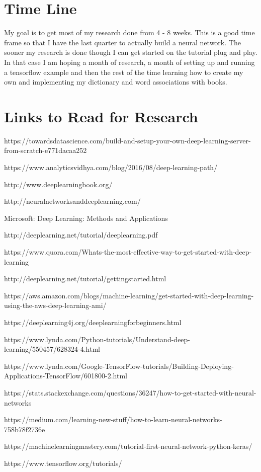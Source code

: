 \documentclass{article}
\begin{document}
\section{Time Line}
My goal is to get most of my research done from 4 - 8 weeks. This is a good time frame so that I have the last quarter to actually build a neural network. The sooner my research is done though I can get started on the tutorial plug and play. In that case I am hoping a month of research, a month of setting up and running a tensorflow example and then the rest of the time learning how to create my own and implementing my dictionary and word associations with books. 

\section{Links to Read for Research}
https://towardsdatascience.com/build-and-setup-your-own-deep-learning-server-from-scratch-e771dacaa252

https://www.analyticsvidhya.com/blog/2016/08/deep-learning-path/

http://www.deeplearningbook.org/

http://neuralnetworksanddeeplearning.com/

Microsoft: Deep Learning: Methods and Applications

http://deeplearning.net/tutorial/deeplearning.pdf

https://www.quora.com/Whats-the-most-effective-way-to-get-started-with-deep-learning

http://deeplearning.net/tutorial/gettingstarted.html

https://aws.amazon.com/blogs/machine-learning/get-started-with-deep-learning-using-the-aws-deep-learning-ami/

https://deeplearning4j.org/deeplearningforbeginners.html

https://www.lynda.com/Python-tutorials/Understand-deep-learning/550457/628324-4.html

https://www.lynda.com/Google-TensorFlow-tutorials/Building-Deploying-Applications-TensorFlow/601800-2.html

https://stats.stackexchange.com/questions/36247/how-to-get-started-with-neural-networks

https://medium.com/learning-new-stuff/how-to-learn-neural-networks-758b78f2736e

https://machinelearningmastery.com/tutorial-first-neural-network-python-keras/

https://www.tensorflow.org/tutorials/
\end{document}
